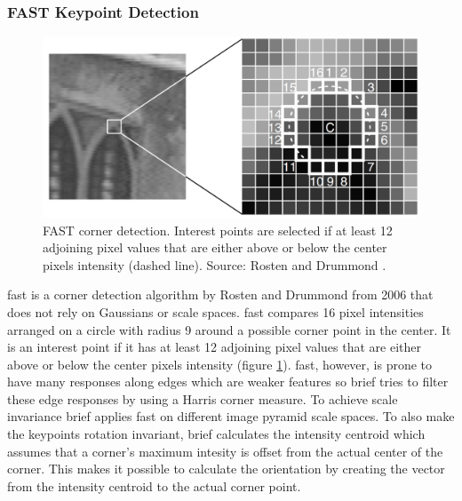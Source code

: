 \subsubsection*{FAST Keypoint Detection}
\begin{figure}[ht]
	\centering
	\includegraphics[scale=0.3]{figures/theoryFAST_corners}
	\caption{FAST corner detection. Interest points are selected if at least 12 adjoining pixel values that are either above or below the center pixels intensity {(dashed line)}. Source: Rosten and Drummond \cite{Rosten}.}
	\label{fig:fastCorners}
\end{figure}
\gls{fast} is a corner detection algorithm by Rosten and Drummond from 2006 that does not rely on Gaussians or scale spaces. \gls{fast} compares 16 pixel intensities arranged on a circle with radius 9 around a possible corner point in the center. It is an interest point if it has at least 12 adjoining pixel values that are either above or below the center pixels intensity {(figure \ref{fig:fastCorners})}. \gls{fast}, however, is prone to have many responses along edges which are weaker features so \gls{brief} tries to filter these edge responses by using a Harris corner measure. To achieve scale invariance \gls{brief} applies \gls{fast} on different image pyramid scale spaces. To also make the keypoints rotation invariant, \gls{brief} calculates the intensity centroid which assumes that a corner's maximum intesity is offset from the actual center of the corner. This makes it possible to calculate the orientation by creating the vector from the intensity centroid to the actual corner point.

